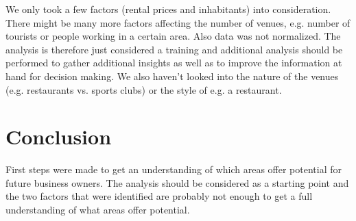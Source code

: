 \documentclass[11pt]{article}
\begin{document}
We only took a few factors (rental prices and inhabitants) into
consideration. There might be many more factors affecting the number of
venues, e.g. number of tourists or people working in a certain area.
Also data was not normalized. The analysis is therefore just considered
a training and additional analysis should be performed to gather
additional insights as well as to improve the information at hand for
decision making. We also haven't looked into the nature of the venues
(e.g. restaurants vs. sports clubs) or the style of e.g. a restaurant.

    \section{Conclusion}\label{conclusion}

First steps were made to get an understanding of which areas offer
potential for future business owners. The analysis should be considered
as a starting point and the two factors that were identified are
probably not enough to get a full understanding of what areas offer
potential.


    
    
    
    
\end{document}
